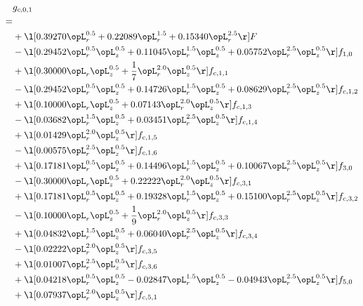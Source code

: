 \begin{alignat}{2} 
\label{eq:g_01_0} 
& g_{c,0,1} \nonumber \\ 
 = \\ 
& + \l[  0.39270 \opL_r^{0.5} +  0.22089 \opL_r^{1.5} +  0.15340 \opL_r^{2.5}  \r] F \nonumber \\ 
& - \l[  0.29452 \opL_r^{0.5} \opL_z^{0.5} +  0.11045 \opL_r^{1.5} \opL_z^{0.5} +  0.05752 \opL_r^{2.5} \opL_z^{0.5}  \r] f_{1,0} \nonumber \\ 
& + \l[  0.30000 \opL_r \opL_z^{0.5} + \frac{1}{7} \opL_r^{2.0} \opL_z^{0.5}  \r] f_{c,1,1} \nonumber \\ 
& - \l[  0.29452 \opL_r^{0.5} \opL_z^{0.5} +  0.14726 \opL_r^{1.5} \opL_z^{0.5} +  0.08629 \opL_r^{2.5} \opL_z^{0.5}  \r] f_{c,1,2} \nonumber \\ 
& + \l[  0.10000 \opL_r \opL_z^{0.5} +  0.07143 \opL_r^{2.0} \opL_z^{0.5}  \r] f_{c,1,3} \nonumber \\ 
& - \l[  0.03682 \opL_r^{1.5} \opL_z^{0.5} +  0.03451 \opL_r^{2.5} \opL_z^{0.5}  \r] f_{c,1,4} \nonumber \\ 
& + \l[  0.01429 \opL_r^{2.0} \opL_z^{0.5}  \r] f_{c,1,5} \nonumber \\ 
& - \l[  0.00575 \opL_r^{2.5} \opL_z^{0.5}  \r] f_{c,1,6} \nonumber \\ 
& + \l[  0.17181 \opL_r^{0.5} \opL_z^{0.5} +  0.14496 \opL_r^{1.5} \opL_z^{0.5} +  0.10067 \opL_r^{2.5} \opL_z^{0.5}  \r] f_{3,0} \nonumber \\ 
& - \l[  0.30000 \opL_r \opL_z^{0.5} +  0.22222 \opL_r^{2.0} \opL_z^{0.5}  \r] f_{c,3,1} \nonumber \\ 
& + \l[  0.17181 \opL_r^{0.5} \opL_z^{0.5} +  0.19328 \opL_r^{1.5} \opL_z^{0.5} +  0.15100 \opL_r^{2.5} \opL_z^{0.5}  \r] f_{c,3,2} \nonumber \\ 
& - \l[  0.10000 \opL_r \opL_z^{0.5} + \frac{1}{9} \opL_r^{2.0} \opL_z^{0.5}  \r] f_{c,3,3} \nonumber \\ 
& + \l[  0.04832 \opL_r^{1.5} \opL_z^{0.5} +  0.06040 \opL_r^{2.5} \opL_z^{0.5}  \r] f_{c,3,4} \nonumber \\ 
& - \l[  0.02222 \opL_r^{2.0} \opL_z^{0.5}  \r] f_{c,3,5} \nonumber \\ 
& + \l[  0.01007 \opL_r^{2.5} \opL_z^{0.5}  \r] f_{c,3,6} \nonumber \\ 
& + \l[  0.04218 \opL_r^{0.5} \opL_z^{0.5}   -0.02847 \opL_r^{1.5} \opL_z^{0.5}   -0.04943 \opL_r^{2.5} \opL_z^{0.5}  \r] f_{5,0} \nonumber \\ 
& + \l[  0.07937 \opL_r^{2.0} \opL_z^{0.5}  \r] f_{c,5,1} \nonumber \\ 

\end{alignat}
